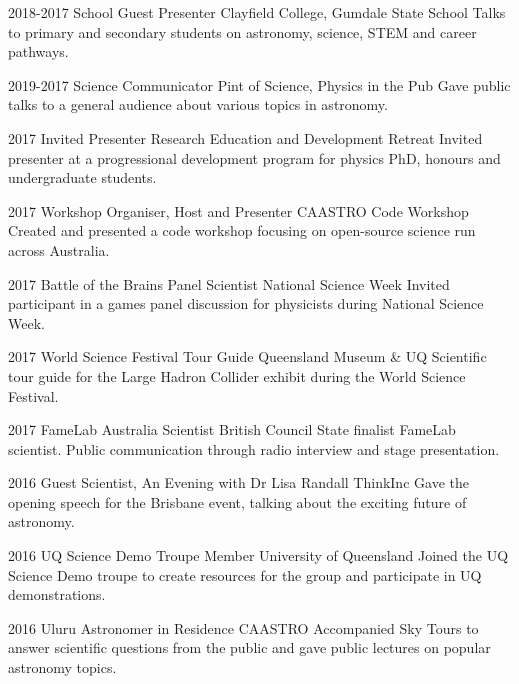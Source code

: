 \begin{entrylist}
\entry
    {2018-2017}
    {School Guest Presenter}
    {Clayfield College, Gumdale State School}
    {Talks to primary and secondary students on astronomy, science, STEM and career pathways.}
\end{entrylist}
\begin{entrylist}
\entry
   {2019-2017}
   {Science Communicator}
   {Pint of Science, Physics in the Pub}
   {Gave public talks to a general audience about various topics in astronomy.}
\end{entrylist}
\begin{entrylist}
\entry
    {2017}
    {Invited Presenter}
    {Research Education and Development Retreat}
    {Invited presenter at a progressional development program for physics PhD, honours and undergraduate students.}
\end{entrylist}
\begin{entrylist}
\entry
    {2017}
    {Workshop Organiser, Host and Presenter}
    {CAASTRO Code Workshop}
    {Created and presented a code workshop focusing on open-source science run across Australia.}
\end{entrylist}
\begin{entrylist}
\entry
    {2017}
    {Battle of the Brains Panel Scientist}
    {National Science Week}
    {Invited participant in a games panel discussion for physicists during National Science Week.}
\end{entrylist}
\begin{entrylist}
\entry
    {2017}
    {World Science Festival Tour Guide}
    {Queensland Museum \& UQ}
    {Scientific tour guide for the Large Hadron Collider exhibit during the World Science Festival.}
\end{entrylist}
\begin{entrylist}
\entry
    {2017}
    {FameLab Australia Scientist}
    {British Council}
    {State finalist FameLab scientist. Public communication through radio interview and stage presentation.}
\end{entrylist}
\begin{entrylist}
\entry
    {2016}
    {Guest Scientist, An Evening with Dr Lisa Randall}
    {ThinkInc}
    {Gave the opening speech for the Brisbane event, talking about the exciting future of astronomy.}
\end{entrylist}
\begin{entrylist}
\entry
    {2016}
    {UQ Science Demo Troupe Member}
    {University of Queensland}
    {Joined the UQ Science Demo troupe to create resources for the group and participate in UQ demonstrations.}
\end{entrylist}
\begin{entrylist}
\entry
    {2016}
    {Uluru Astronomer in Residence}
    {CAASTRO}
    {Accompanied Sky Tours to answer scientific questions from the public and gave public lectures on popular astronomy topics.}
\end{entrylist}


